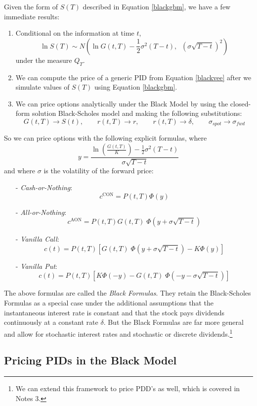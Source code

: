 \documentclass[12pt]{article}
\theoremstyle{plain}
\theoremstyle{definition}
\theoremstyle{remark}
\begin{document}
Given the form of $S(T)$ described in Equation \ref{blackgbm}, we 
have a few immediate results:
\begin{enumerate}
   \item{Conditional on the information at time $t$, 
      \[ \ln S(T) \sim N\left( \ln G(t,T) - \frac{1}{2} \sigma^2 (T-t), 
	 \;\; (\sigma \sqrt{T-t})^2 \right) \]
      under the measure $Q_T$. 
   }
   \item{We can compute the price of a generic PID from Equation 
      \ref{blackvee} after we simulate values of $S(T)$ using 
      Equation \ref{blackgbm}. 
   }
   \item{We can price options analytically under the Black Model
      by using the closed-form solution Black-Scholes model and
      making the following substitutions:
      \[ G(t,T) \rightarrow S(t), \qquad r(t,T) \rightarrow r,
	 \qquad r(t,T) \rightarrow \delta, \qquad \sigma_{spot}
	 \rightarrow \sigma_{fwd}\]
      }
\end{enumerate}
So we can price options with the following explicit formulas, where
   \[ y = \frac{ \ln\left(\frac{G(t,T)}{K}\right) - \frac{1}{2}
      \sigma^2 (T-t)}{\sigma \sqrt{T-t}} \]
and where $\sigma$ is the volatility of the forward price:
\begin{itemize}
   \item[-]{\emph{Cash-or-Nothing}: 
      \[c^{\text{CON}}  = P(t,T) \Phi(y)\]
      }
   \item[-]{\emph{All-or-Nothing}:
      \[c^{\text{AON}}  = P(t,T) G(t,T) \; \Phi(y + \sigma\sqrt{T-t})\]
      }
   \item[-]{\emph{Vanilla Call}:
      \[c(t)  = P(t,T) \left[ G(t,T) \; \Phi(y + \sigma\sqrt{T-t})
	 - K \Phi(y) \right] 
	 \]
      }
   \item[-]{\emph{Vanilla Put}:
      \[c(t)  = P(t,T) \left[ K \Phi(-y) - 
	 G(t,T) \; \Phi(-y - \sigma\sqrt{T-t}) \right] 
	 \]
      }  
\end{itemize}
The above formulas are called the \emph{Black Formulas}. They retain
the Black-Scholes Formulas as a special case under the additional
assumptions that the instantaneous interest rate is constant and that
the stock pays dividends continuously at a constant rate $\delta$.
But the Black Formulas are far more general and allow for stochastic
interest rates and stochastic or discrete dividends.\footnote{We can
   extend this framework to price PDD's as well, which is covered
in Notes 3.}

\newpage
\subsection{Pricing PIDs in the Black Model}
\end{document}
